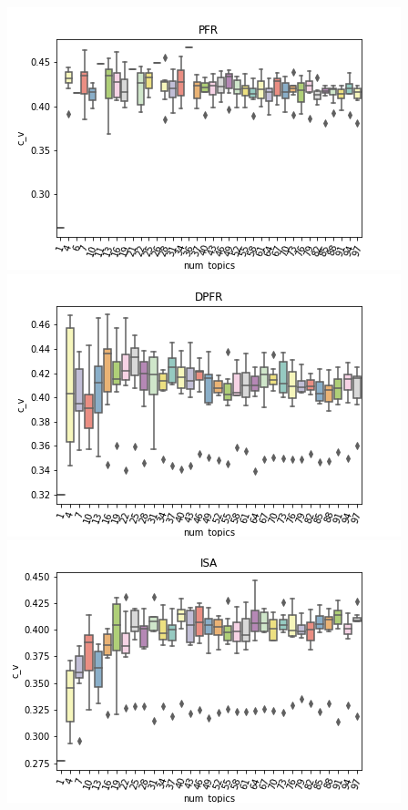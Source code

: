 \documentclass{article}
\begin{document}
\begin{multicols}{2}
\includegraphics[width=\columnwidth]{../images/PFR_c_v.png}
\includegraphics[width=\columnwidth]{../images/DPFR_c_v.png}
\includegraphics[width=\columnwidth]{../images/ISA_c_v.png}


\end{multicols}
\end{document}
